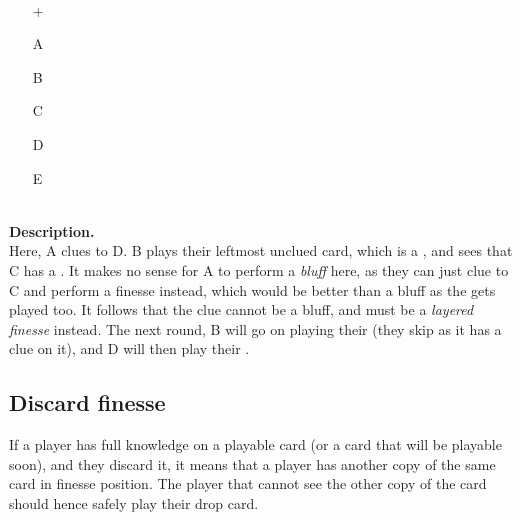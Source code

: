 \begin{example}	\hfill \\
	\begin{minipage}{0.45\textwidth}
		\begin{itemize}
			\item[\Large +]      
			\item[\Large A]    
			\item[\Large B]    
			\item[\Large C]    
			\item[\Large D]    
			\item[\Large E]    
		\end{itemize}
	\end{minipage}%
	\begin{minipage}{0.55\textwidth}
		\hfill \\
		
		\textbf{Description.} \\
		
		Here, A clues  to D. B plays their leftmost unclued card, which is a , and sees that C has a . It makes no sense for A to perform a \textit{bluff} here, as they can just clue  to C and perform a finesse instead, which would be better than a bluff as the  gets played too. It follows that the  clue cannot be a bluff, and must be a \emph{layered finesse} instead. The next round, B will go on playing their  (they skip  as it has a  clue on it), and D will then play their .
	\end{minipage}
\end{example} \vspace{0.15 cm}

\subsection{Discard finesse}

\begin{convention}
	If a player has full knowledge on a playable card (or a card that will be playable soon), and they discard it, it means that a player has another copy of the same card in finesse position. The player that cannot see the other copy of the card should hence safely play their drop card.
\end{convention}

